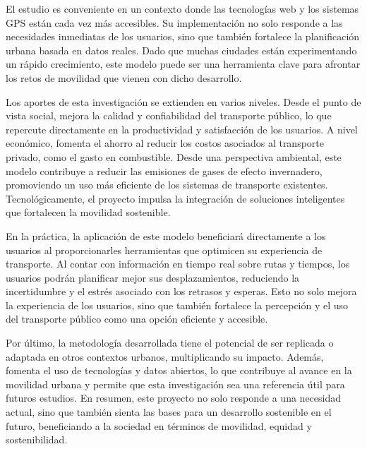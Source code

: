 El estudio es conveniente en un contexto donde las tecnologías web y los sistemas GPS están cada vez más accesibles. Su implementación no solo responde a las necesidades inmediatas de los usuarios, sino que también fortalece la planificación urbana basada en datos reales. Dado que muchas ciudades están experimentando un rápido crecimiento, este modelo puede ser una herramienta clave para afrontar los retos de movilidad que vienen con dicho desarrollo.

Los aportes de esta investigación se extienden en varios niveles. Desde el punto de vista social, mejora la calidad y confiabilidad del transporte público, lo que repercute directamente en la productividad y satisfacción de los usuarios. A nivel económico, fomenta el ahorro al reducir los costos asociados al transporte privado, como el gasto en combustible. Desde una perspectiva ambiental, este modelo contribuye a reducir las emisiones de gases de efecto invernadero, promoviendo un uso más eficiente de los sistemas de transporte existentes. Tecnológicamente, el proyecto impulsa la integración de soluciones inteligentes que fortalecen la movilidad sostenible.

En la práctica, la aplicación de este modelo beneficiará directamente a los usuarios al proporcionarles herramientas que optimicen su experiencia de transporte. Al contar con información en tiempo real sobre rutas y tiempos, los usuarios podrán planificar mejor sus desplazamientos, reduciendo la incertidumbre y el estrés asociado con los retrasos y esperas. Esto no solo mejora la experiencia de los usuarios, sino que también fortalece la percepción y el uso del transporte público como una opción eficiente y accesible.

Por último, la metodología desarrollada tiene el potencial de ser replicada o adaptada en otros contextos urbanos, multiplicando su impacto. Además, fomenta el uso de tecnologías y datos abiertos, lo que contribuye al avance en la movilidad urbana y permite que esta investigación sea una referencia útil para futuros estudios. En resumen, este proyecto no solo responde a una necesidad actual, sino que también sienta las bases para un desarrollo sostenible en el futuro, beneficiando a la sociedad en términos de movilidad, equidad y sostenibilidad.

